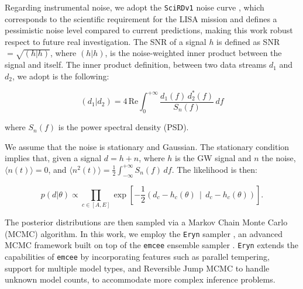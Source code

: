 Regarding instrumental noise, we adopt the \texttt{SciRDv1} noise curve \cite{LISA2018}, which corresponds to the scientific requirement for the LISA mission and defines a pessimistic noise level compared to current predictions, making this work robust respect to future real investigation. The SNR of a signal $h$ is defined as SNR $ = \sqrt{(h|h)} $, where $(h|h)$, is the noise-weighted inner product between the signal and itself. The inner product definition,  between two data streams $d_1$ and $d_2$, we adopt is the following:

\begin{equation}
(d_1 | d_2) = 4 \, \mathrm{Re} \int_0^{+\infty} \frac{d_1(f) \, d_2^*(f)}{S_n(f)} \, df
\end{equation}

\noindent 
where $S_n(f)$ is the power spectral density (PSD).

We assume that the noise is stationary and Gaussian. The stationary condition implies that, given a signal $ d = h + n $, where $h$ is the GW signal and $n$ the noise,  $\langle n(t) \rangle = 0 $, and $ \langle n^2(t) \rangle = \frac{1}{2} \int_{-\infty}^{+\infty} S_n(f) \, df$. The likelihood is then:

\begin{equation}
p(d|\theta) \propto \prod_{c \in [A, E]} \exp\left[ -\frac{1}{2} \left( d_c - h_c(\theta) \,\middle|\, d_c - h_c(\theta) \right) \right].
\end{equation}

The posterior distributions are then sampled via a Markov Chain Monte Carlo (MCMC) algorithm. In this work, we employ the \texttt{Eryn} sampler \cite{Karnesis_2023, michael_katz_2023_7705496}, an advanced MCMC framework built on top of the \texttt{emcee} ensemble sampler \cite{2013PASP..125..306F}. \texttt{Eryn} extends the capabilities of \texttt{emcee} by incorporating features such as parallel tempering, support for multiple model types, and Reversible Jump MCMC to handle unknown model counts, to accommodate more complex inference problems.